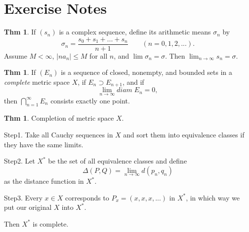 \documentclass{article}
\theoremstyle{definition}
\newtheorem{theorem}[definition]{Thm}
\begin{document}
\section{Exercise Notes}
\begin{theorem}
    If $(s_n)$ is a complex sequence, define its arithmetic means $\sigma_n$ by
    \[
    \sigma_n = \frac{s_0+s_1+...+s_n}{n+1}\qquad (n=0,1,2,...). 
    \]
    Assume $M<\infty$, $|na_n|\leq M$ for all $n$, and $\lim \sigma_n=\sigma$. Then $\lim_{n\to\infty}s_n=\sigma$.
\end{theorem}
\begin{theorem}
    If $(E_n)$ is a sequence of closed, nonempty, and bounded sets in a \textit{complete} metric space $X$, if $E_n\supset E_{n+1}$, and if
    \[
    \lim_{n\to\infty} diam\;E_n=0,
    \]
    then $\bigcap_{n=1}^\infty E_n$ consists exactly one point.
\end{theorem}
\begin{theorem}
    Completion of metric space $X$.\par
    Step1. Take all Cauchy sequences in $X$ and sort them into equivalence classes if they have the same limits.\par
    Step2. Let $X^*$ be the set of all equivalence classes and define 
    \[
    \Delta(P,Q)=\lim_{n\to\infty}d(p_n, q_n)
    \]
    as the distance function in $X^*$.\par
    Step3. Every $x\in X$ corresponds to $P_x=(x,x,x,...)$ in $X^*$, in which way we put our original $X$ into $X^*$.\par
    Then $X^*$ is complete.
\end{theorem}
\end{document}
